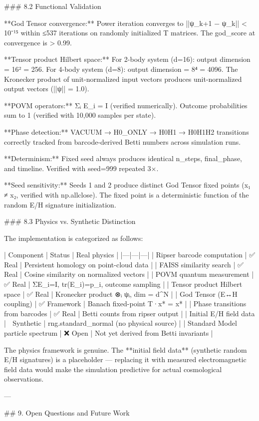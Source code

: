 ### 8.2 Functional Validation

**God Tensor convergence:** Power iteration converges to ||ψ_{k+1} − ψ_k|| < 10⁻¹⁵ within ≤537 iterations on randomly initialized T matrices.  The god_score at convergence is > 0.99.

**Tensor product Hilbert space:** For 2-body system (d=16): output dimension = 16² = 256.  For 4-body system (d=8): output dimension = 8⁴ = 4096.  The Kronecker product of unit-normalized input vectors produces unit-normalized output vectors (||ψ|| = 1.0).

**POVM operators:** Σᵢ E_i = I (verified numerically).  Outcome probabilities sum to 1 (verified with 10,000 samples per state).

**Phase detection:** VACUUM → H0_ONLY → H0H1 → H0H1H2 transitions correctly tracked from barcode-derived Betti numbers across simulation runs.

**Determinism:** Fixed seed always produces identical n_steps, final_phase, and timeline.  Verified with seed=999 repeated 3×.

**Seed sensitivity:** Seeds 1 and 2 produce distinct God Tensor fixed points (x₁ ≠ x₂, verified with np.allclose).  The fixed point is a deterministic function of the random E/H signature initialization.

### 8.3 Physics vs. Synthetic Distinction

The implementation is categorized as follows:

| Component | Status | Real physics |
|---|---|---|
| Ripser barcode computation | ✅ Real | Persistent homology on point-cloud data |
| FAISS similarity search | ✅ Real | Cosine similarity on normalized vectors |
| POVM quantum measurement | ✅ Real | ΣE_i=I, tr(E_i)=p_i, outcome sampling |
| Tensor product Hilbert space | ✅ Real | Kronecker product ⊗ᵢ ψᵢ, dim = d^N |
| God Tensor (E↔H coupling) | ✅ Framework | Banach fixed-point T·x* = x* |
| Phase transitions from barcodes | ✅ Real | Betti counts from ripser output |
| Initial E/H field data | 🔶 Synthetic | rng.standard_normal (no physical source) |
| Standard Model particle spectrum | ❌ Open | Not yet derived from Betti invariants |

The physics framework is genuine.  The **initial field data** (synthetic random E/H signatures) is a placeholder — replacing it with measured electromagnetic field data would make the simulation predictive for actual cosmological observations.

---

## 9. Open Questions and Future Work

